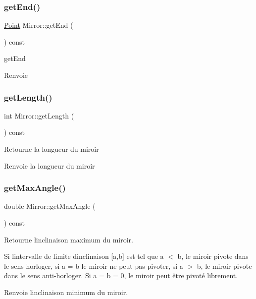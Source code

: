 \subsubsection{\texorpdfstring{getEnd()}{getEnd()}}
{\footnotesize\ttfamily \mbox{\hyperlink{class_point}{Point}} Mirror\+::get\+End (\begin{DoxyParamCaption}{ }\end{DoxyParamCaption}) const}



get\+End 

\begin{DoxyReturn}{Renvoie}

\end{DoxyReturn}
\mbox{\label{class_mirror_ad34397fa07da0b668c4baad8bb52feed}} 
\subsubsection{\texorpdfstring{getLength()}{getLength()}}
{\footnotesize\ttfamily int Mirror\+::get\+Length (\begin{DoxyParamCaption}{ }\end{DoxyParamCaption}) const}

Retourne la longueur du miroir \begin{DoxyReturn}{Renvoie}
la longueur du miroir 
\end{DoxyReturn}
\mbox{\label{class_mirror_a89bfd8251862a7b732263e3c248e16bc}} 
\subsubsection{\texorpdfstring{getMaxAngle()}{getMaxAngle()}}
{\footnotesize\ttfamily double Mirror\+::get\+Max\+Angle (\begin{DoxyParamCaption}{ }\end{DoxyParamCaption}) const}

Retourne l\textquotesingle{}inclinaison maximum du miroir. 

Si l\textquotesingle{}intervalle de limite d\textquotesingle{}inclinaison \mbox{[}a,b\mbox{]} est tel que a $<$ b, le miroir pivote dans le sens horloger, si a = b le miroir ne peut pas pivoter, si a $>$ b, le miroir pivote dans le sens anti-\/horloger. Si a = b = 0, le miroir peut être pivoté librement. \begin{DoxyReturn}{Renvoie}
l\textquotesingle{}inclinaison minimum du miroir. 
\end{DoxyReturn}
\mbox{\label{class_mirror_a076c93924786f27c8f203aa2574062bb}} 
